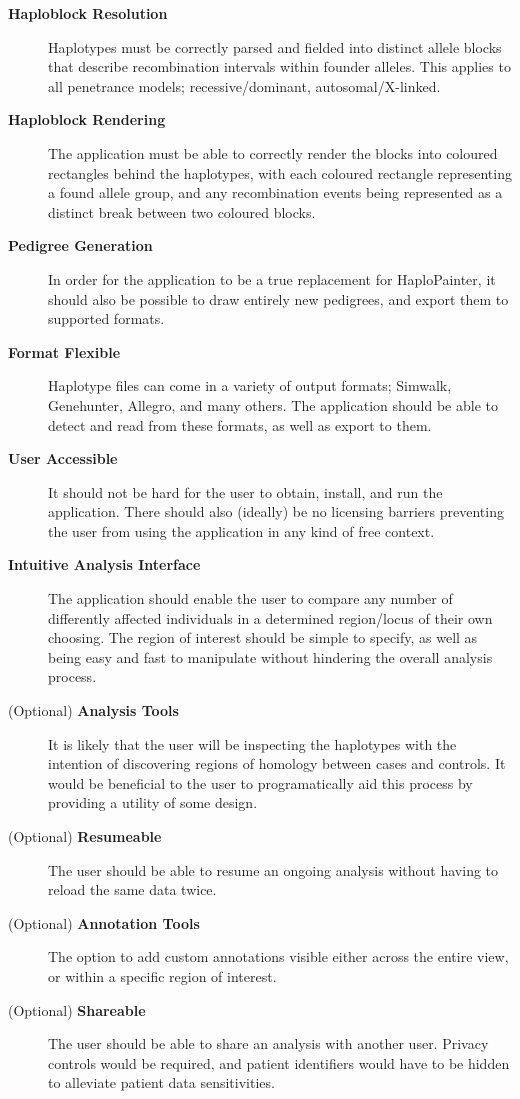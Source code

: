 \begin{description}
\item[\textbf{Haploblock Resolution}]{Haplotypes must be correctly parsed and fielded into distinct allele blocks that describe recombination intervals within founder alleles. This applies to all penetrance models; recessive/dominant, autosomal/X-linked.}
\item[\textbf{Haploblock Rendering}]{The application must be able to correctly render the blocks into coloured rectangles behind the haplotypes, with each coloured rectangle representing a found allele group, and any recombination events being represented as a distinct break between two coloured blocks.}
\item[\textbf{Pedigree Generation}]{In order for the application to be a true replacement for HaploPainter, it should also be possible to draw entirely new pedigrees, and export them to supported formats.}
\item[\textbf{Format Flexible}]{Haplotype files can come in a variety of output formats; Simwalk, Genehunter, Allegro, and many others. The application should be able to detect and read from these formats, as well as export to them.}
\item[\textbf{User Accessible}]{It should not be hard for the user to obtain, install, and run the application. There should also (ideally) be no licensing barriers preventing the user from using the application in any kind of free context.}
\item[\textbf{Intuitive Analysis Interface}]{The application should enable the user to compare any number of differently affected individuals in a determined region/locus of their own choosing. The region of interest should be simple to specify, as well as being easy and fast to manipulate without hindering the overall analysis process.}
\item[(Optional) \textbf{Analysis Tools}]{It is likely that the user will be inspecting the haplotypes with the intention of discovering regions of homology between cases and controls. It would be beneficial to the user to programatically aid this process by providing a utility of some design.}
\item[(Optional) \textbf{Resumeable}]{The user should be able to resume an ongoing analysis without having to reload the same data twice.}
\item[(Optional) \textbf{Annotation Tools}]{The option to add custom annotations visible either across the entire view, or within a specific region of interest.}
\item[(Optional) \textbf{Shareable}]{The user should be able to share an analysis with another user. Privacy controls would be required, and patient identifiers would have to be hidden to alleviate patient data sensitivities.}
\end{description}


